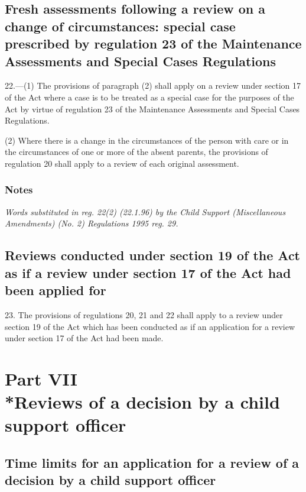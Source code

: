 \documentclass[a4paper]{article}
\newcommand{\parthead}{}
\newcommand\amendment[1]{\subsubsection*{Notes}{\itshape\frenchspacing\footnotesize #1 \par}}
\begin{document}
\subsection[22. Fresh assessments following a review on a change of circumstances: special case prescribed by regulation 23 of the Maintenance Assessments and Special Cases Regulations]{Fresh assessments following a review on a change of circumstances: special case prescribed by regulation 23 of the Maintenance Assessments and Special Cases Regulations}

22.—(1) The provisions of paragraph (2) shall apply on a review under section 17 of the Act where a case is to be treated as a special case for the purposes of the Act by virtue of regulation 23 of the Maintenance Assessments and Special Cases Regulations.

(2) Where there is a change in the circumstances of the person with care or in the circumstances of one or more of the absent parents, the provisions of regulation 20 shall apply to 
a review of each original assessment.  %

\amendment{
Words substituted in reg. 22(2) (22.1.96) by the Child Support (Miscellaneous Amendments) (No. 2) Regulations 1995 reg. 29.
}

\subsection[23. Reviews conducted under section 19 of the Act as if a review under section 17 of the Act had been applied for]{Reviews conducted under section 19 of the Act as if a review under section 17 of the Act had been applied for}

23.  The provisions of regulations 20, 21 and 22 shall apply to a review under section 19 of the Act which has been conducted as if an application for a review under section 17 of the Act had been made.

\section[Part VII --- Reviews of a decision by a child support officer]{Part VII\\*Reviews of a decision by a child support officer}

\renewcommand\parthead{--- Part VII}

\subsection[24. Time limits for an application for a review of a decision by a child support officer]{Time limits for an application for a review of a decision by a child support officer}
\end{document}
